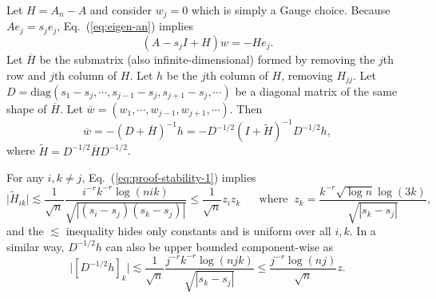 \documentclass[11pt,a4paper]{article}
\renewcommand{\tilde}{\widetilde}
\renewcommand{\bar}{\overline}
\theoremstyle{definition}
\theoremstyle{plain}
\theoremstyle{remark}
\newcommand{\diag}{\mathrm{diag}}
\begin{document}
Let $H=A_n-A$ and consider $w_j=0$ which is simply a Gauge choice. Because $Ae_j=s_je_j$, Eq.~(\ref{eq:eigen-an}) implies
$$
(A-s_j I+H)w = -He_j.
$$
Let $\bar H$ be the submatrix (also infinite-dimensional) formed by removing the $j$th row and $j$th column of $H$. Let $h$ be the $j$th column of $H$, removing $H_{jj}$.
Let $D=\diag(s_1-s_j,\cdots,s_{j-1}-s_j,s_{j+1}-s_j,\cdots)$ be a diagonal matrix of the same shape of $\bar H$. 
Let $\bar w=(w_1,\cdots,w_{j-1},w_{j+1},\cdots)$. Then
$$
\bar w = -(D+\bar H)^{-1}h = -D^{-1/2}(I+\tilde H)^{-1}D^{-1/2}h,
$$
where $\tilde H = D^{-1/2} \bar H D^{-1/2}$. 

For any $i,k\neq j$, Eq.~(\ref{eq:proof-stability-1}) implies
$$
\big|\tilde H_{ik}\big| \lesssim \frac{1}{\sqrt{n}} \frac{i^{-r}k^{-r}\log(nik)}{\sqrt{|(s_i-s_j)(s_k-s_j)|}} \leq \frac{1}{\sqrt{n}}z_iz_k\;\;\;\;\;\;\text{where}\;\; z_k = \frac{k^{-r}{\sqrt{\log n}\log(3k)}}{\sqrt{|s_k-s_j|}},
$$
and the $\lesssim$ inequality hides only constants and is uniform over all $i,k$.
In a similar way, $D^{-1/2}h$ can also be upper bounded component-wise as
\begin{equation}
\big|[D^{-1/2}h]_k \big| \lesssim  \frac{1}{\sqrt{n}}\frac{j^{-r}k^{-r}\log(njk)}{\sqrt{|s_k-s_j|}}\leq \frac{j^{-r}\log(nj)}{\sqrt{n}}z.
\label{eq:proof-stability-3}
\end{equation}
\end{document}
